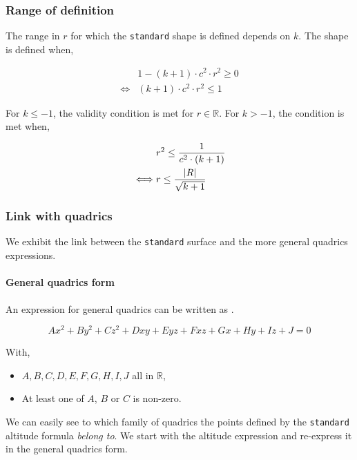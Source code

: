 \subsubsection{Range of definition}
The range in $r$ for which the \lstinline{standard} shape is defined
depends on $k$. The shape is defined when,

\begin{equation} \begin{split}
& 1 - (k+1) \cdot c^2 \cdot r^2 \geq 0 \\
\iff & (k+1) \cdot c^2 \cdot r^2 \leq 1
\end{split} \end{equation}

For $k \leq -1$, the validity condition is met for $r \in \mathbb{R}$.
For $k > -1$, the condition is met when,

\begin{equation} \begin{split}
& r^2 \leq \frac{1}{c^2 \cdot (k+1)} \\
\iff & r \leq \frac{\abs{R}}{\sqrt{k+1}}
\end{split} \end{equation}

\subsubsection{Link with quadrics}
We exhibit the link between the \lstinline{standard} surface and the
more general quadrics expressions.

\paragraph{General quadrics form}
An expression for general quadrics can be written as \cite{wiki:quadric}.

\begin{equation}
A x^2 + B y^2 + C z^2 + D x y + E y z + F x z + G x + H y + I z + J = 0
\end{equation}

With,
\begin{itemize}
\item $A, B, C, D, E, F, G, H, I, J$ all in $\mathbb{R}$,
\item At least one of $A$, $B$ or $C$ is non-zero.
\end{itemize}

We can easily see to which family of quadrics the points defined by the
\lstinline{standard} altitude formula \emph{belong to}. We start with
the altitude expression and re-express it in the general quadrics form.

